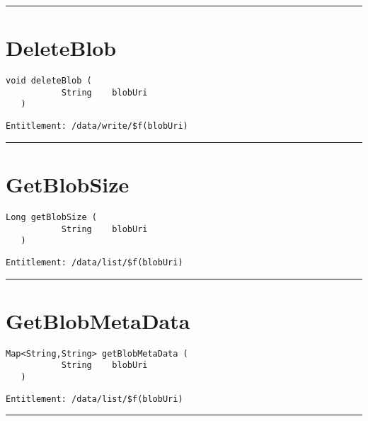 \rule{12cm}{2pt}
\section{DeleteBlob}
\label{Api:DeleteBlob}
\begin{lstlisting}[style=nonumbers]
   void deleteBlob (
           String    blobUri
   )
\end{lstlisting}
\begin{Verbatim}[formatcom=\color{Maroon}]
  Entitlement: /data/write/$f(blobUri)
\end{Verbatim}



\rule{12cm}{2pt}
\section{GetBlobSize}
\label{Api:GetBlobSize}
\begin{lstlisting}[style=nonumbers]
   Long getBlobSize (
           String    blobUri
   )
\end{lstlisting}
\begin{Verbatim}[formatcom=\color{Maroon}]
  Entitlement: /data/list/$f(blobUri)
\end{Verbatim}



\rule{12cm}{2pt}
\section{GetBlobMetaData}
\label{Api:GetBlobMetaData}
\begin{lstlisting}[style=nonumbers]
   Map<String,String> getBlobMetaData (
           String    blobUri
   )
\end{lstlisting}
\begin{Verbatim}[formatcom=\color{Maroon}]
  Entitlement: /data/list/$f(blobUri)
\end{Verbatim}



\rule{12cm}{2pt}

